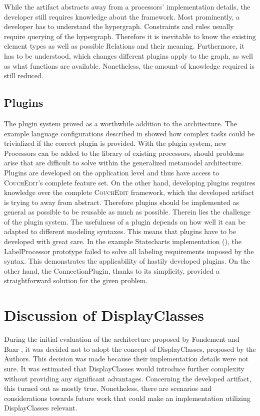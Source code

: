 While the artifact abstracts away from a processors' implementation details, the developer still requires knowledge about the framework. Most prominently, a developer has to understand the hypergraph. Constraints and rules usually require querying of the hypergraph. Therefore it is inevitable to know the existing element types as well as possible Relations and their meaning. Furthermore, it has to be understood, which changes different plugins apply to the graph, as well as what functions are available. Nonetheless, the amount of knowledge required is still reduced.

\subsection{Plugins}
The plugin system proved as a worthwhile addition to the architecture. The example language configurations described in  showed how complex tasks could be trivialized if the correct plugin is provided. With the plugin system, new Processors can be added to the library of existing processors, should problems arise that are difficult to solve within the generalized metamodel architecture. Plugins are developed on the application level and thus have access to \textsc{CouchEdit}'s complete feature set. On the other hand, developing plugins requires knowledge over the complete \textsc{CouchEdit} framework, which the developed artifact is trying to away from abstract. Therefore plugins should be implemented as general as possible to be reusable as much as possible. Therein lies the challenge of the plugin system. The usefulness of a plugin depends on how well it can be adapted to different modeling syntaxes. This means that plugins have to be developed with great care. In the example Statecharts implementation (), the LabelProcessor prototype failed to solve all labeling requirements imposed by the syntax. This demonstrates the applicability of hastily developed plugins. On the other hand, the ConnectionPlugin, thanks to its simplicity, provided a straightforward solution for the given problem.

\section{Discussion of DisplayClasses}
\label{sec:dc-disc}
During the initial evaluation of the architecture proposed by Fondement and Baar \cite{fondement_making_2005}, it was decided not to adopt the concept of DisplayClasses, proposed by the Authors. This decision was made because their implementation details were not sure. It was estimated that DisplayClasses would introduce further complexity without providing any significant advantages. Concerning the developed artifact, this turned out as mostly true. Nonetheless, there are scenarios and considerations towards future work that could make an implementation utilizing DisplayClasses relevant.

